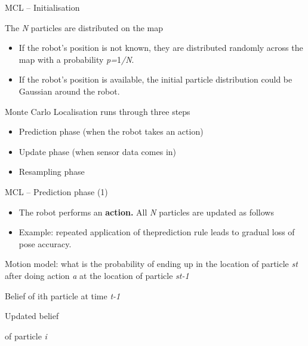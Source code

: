 \documentclass[compress]{beamer}
\begin{document}
\begin{frame}{MCL -- Initialisation}

The \emph{N} particles are distributed on the map

\begin{itemize}
\item If the robot's position is not known, they are distributed randomly
  across the map with a probability \emph{p=}1\emph{/N}.
\item If the robot's position is available, the initial particle
  distribution could be Gaussian around the robot.
\end{itemize}

Monte Carlo Localisation runs through three steps

\begin{itemize}
\item Prediction phase (when the robot takes an action)
\item Update phase (when sensor data comes in)
\item Resampling phase
\end{itemize}

\end{frame}

\begin{frame}{MCL -- Prediction phase (1)}

\begin{itemize}
\item The robot performs an \textbf{action.} All \emph{N} particles are
  updated as follows
\item Example: repeated application of theprediction rule leads to gradual
  loss of pose accuracy.
\end{itemize}

Motion model: what is the probability of ending up in the location of
particle \emph{st} after doing action \emph{a} at the location of
particle \emph{st-1}

Belief of ith particle at time \emph{t-1}

Updated belief

of particle \emph{i}

\end{frame}
\end{document}
